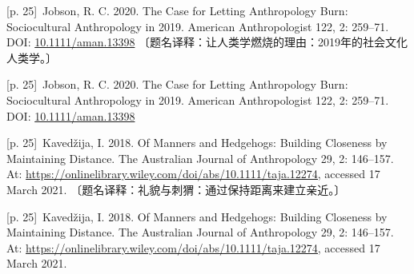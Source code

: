 \documentclass[10pt,a4paper]{article}
\begin{document}
\noindent\begin{minipage}{\textwidth}\begin{minipage}[t]{\dimexpr.5\textwidth-4mm\relax}\noindent\begin{minipage}[t]{\linewidth}{\scriptsize\color{gray} [p. 25]}\ Jobson, R. C. 2020. The Case for Letting Anthropology Burn: Sociocultural Anthropology in 2019. American Anthropologist 122, 2: 259–71. DOI: \url{10.1111/aman.13398} 〔题名译释：让人类学燃烧的理由：2019年的社会文化人类学。〕\par\end{minipage}\par\end{minipage}\hfill\begin{minipage}[t]{\dimexpr.5\textwidth-4mm\relax}\noindent\begin{minipage}[t]{\linewidth}{\scriptsize\color{gray} [p. 25]}\ Jobson, R. C. 2020. The Case for Letting Anthropology Burn: Sociocultural Anthropology in 2019. American Anthropologist 122, 2: 259–71. DOI: \url{10.1111/aman.13398}\par\end{minipage}\par\end{minipage}\end{minipage}\par
\noindent\begin{minipage}{\textwidth}\begin{minipage}[t]{\dimexpr.5\textwidth-4mm\relax}\noindent\begin{minipage}[t]{\linewidth}{\scriptsize\color{gray} [p. 25]}\ Kavedžija, I. 2018. Of Manners and Hedgehogs: Building Closeness by Maintaining Distance. The Australian Journal of Anthropology 29, 2: 146–157. At: \url{https://onlinelibrary.wiley.com/doi/abs/10.1111/taja.12274,} accessed 17 March 2021. 〔题名译释：礼貌与刺猬：通过保持距离来建立亲近。〕\par\end{minipage}\par\end{minipage}\hfill\begin{minipage}[t]{\dimexpr.5\textwidth-4mm\relax}\noindent\begin{minipage}[t]{\linewidth}{\scriptsize\color{gray} [p. 25]}\ Kavedžija, I. 2018. Of Manners and Hedgehogs: Building Closeness by Maintaining Distance. The Australian Journal of Anthropology 29, 2: 146–157. At: \url{https://onlinelibrary.wiley.com/doi/abs/10.1111/taja.12274,} accessed 17 March 2021.\par\end{minipage}\par\end{minipage}\end{minipage}\par
\end{document}
